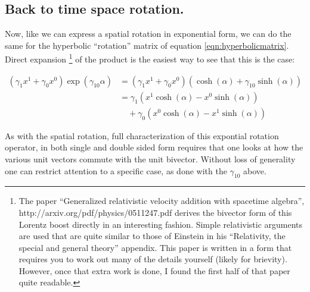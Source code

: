 \documentclass{article}      %
\begin{document}
\subsection{ Back to time space rotation. }

Now, like we can express a spatial rotation in exponential form, we can do the same for the hyperbolic ``rotation'' matrix of equation \ref{eqn:hyperbolicmatrix}.  Direct expansion
\footnote{
The paper ``Generalized relativistic velocity addition with spacetime algebra'', http://arxiv.org/pdf/physics/0511247.pdf derives the bivector form of this Lorentz boost directly in an interesting fashion.  Simple relativistic arguments are used that are quite similar to those of Einstein in his ``Relativity, the special and general theory'' appendix.  This paper is written in a form that requires you to work out many of the details yourself (likely for brievity).  However, once that extra work is done, I found the first half of that paper quite readable.
}
of the product is the easiest way to see that this is the case:

\begin{align*}
\left(\gamma_{1} x^1 + \gamma_{0} x^0 \right)\exp(\gamma_{10}\alpha)
&= 
\left(\gamma_{1} x^1 + \gamma_{0} x^0 \right) \left( \cosh(\alpha) +\gamma_{10}\sinh(\alpha) \right) \\
&= 
  \gamma_1\left( x^1 \cosh(\alpha) - x^0 \sinh(\alpha)\right) \\
& \quad + \gamma_0\left( x^0 \cosh(\alpha) - x^1 \sinh(\alpha)\right)
\end{align*}

As with the spatial rotation, full characterization of this expontial rotation operator, in both single and double sided form requires that one looks at how the various unit vectors commute with the unit bivector.  Without loss of generality one can restrict attention to a specific case, as done with the $\gamma_{10}$ above.
\end{document}
